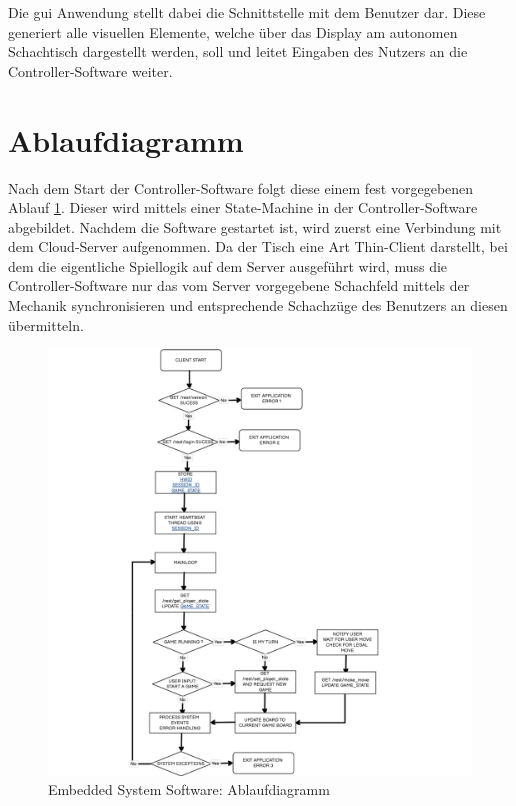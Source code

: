 Die \gls{gui} Anwendung stellt dabei die Schnittstelle mit dem Benutzer
dar. Diese generiert alle visuellen Elemente, welche über das Display am
autonomen Schachtisch dargestellt werden, soll und leitet Eingaben des
Nutzers an die Controller-Software weiter.

\hypertarget{ablaufdiagramm}{%
\section{Ablaufdiagramm}\label{ablaufdiagramm}}

Nach dem Start der Controller-Software folgt diese einem fest
vorgegebenen Ablauf \ref{ATC_gameclient_statemachiene}. Dieser wird
mittels einer State-Machine in der Controller-Software abgebildet.
Nachdem die Software gestartet ist, wird zuerst eine Verbindung mit dem
Cloud-Server aufgenommen. Da der Tisch eine Art Thin-Client darstellt,
bei dem die eigentliche Spiellogik auf dem Server ausgeführt wird, muss
die Controller-Software nur das vom Server vorgegebene Schachfeld
mittels der Mechanik synchronisieren und entsprechende Schachzüge des
Benutzers an diesen übermitteln.

\begin{figure}
\centering
\includegraphics{images/ATC_gameclient_statemachiene.png}
\caption{Embedded System Software: Ablaufdiagramm
\label{ATC_gameclient_statemachiene}}
\end{figure}

